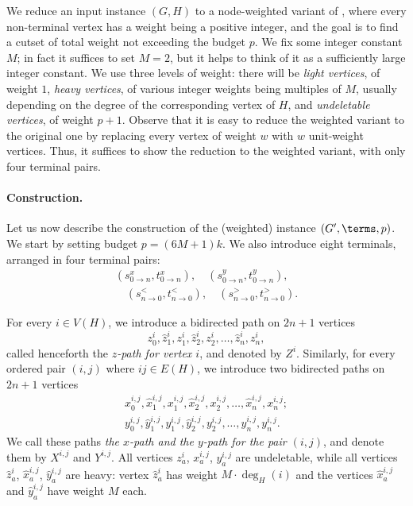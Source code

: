 \newcommand{\sincx}{s_{0 \to n}^{x}}
\newcommand{\tincx}{t_{0 \to n}^{x}}
\newcommand{\sincy}{s_{0 \to n}^{y}}
\newcommand{\tincy}{t_{0 \to n}^{y}}
\newcommand{\sdeclt}{s_{n \to 0}^{<}}
\newcommand{\tdeclt}{t_{n \to 0}^{<}}
\newcommand{\sdecgt}{s_{n \to 0}^{>}}
\newcommand{\tdecgt}{t_{n \to 0}^{>}}

We reduce an input \subiso{} instance $(G,H)$
to a node-weighted variant of \dirmc{}, where every non-terminal vertex has a weight being a positive integer, and the goal is to find a cutset of total weight
not exceeding the budget $p$.
We fix some integer constant $M$; in fact it suffices to set $M=2$,
but it helps to think of it as a sufficiently large integer constant.
 We use three levels of weight: there will be \emph{light vertices}, of weight $1$, \emph{heavy vertices}, of various integer weights being multiples of $M$,
usually depending on the degree of the corresponding vertex of $H$, and \emph{undeletable vertices}, of weight $p+1$. Observe that it is easy to reduce the weighted variant to the original one by replacing every vertex of weight $w$ with $w$ unit-weight vertices. Thus, it suffices to show the reduction to the weighted variant, with only four terminal pairs.

\paragraph{Construction.}
Let us now describe the construction of the (weighted)
\dirmc{} instance $(G',\terms,p)$.
We start by setting budget $p = (6M+1)k$.
We also introduce eight terminals, arranged in four terminal pairs:
\begin{equation*}
\begin{split}
(\sincx,\tincx),\quad (\sincy,\tincy), \\ \quad (\sdeclt,\tdeclt), \quad (\sdecgt,\tdecgt).
\end{split}
\end{equation*}
 
For every $i \in V(H)$, we introduce a bidirected path on $2n+1$ vertices
$$z^i_0, \hat{z}^i_1, z^i_1, \hat{z}^i_2, z^i_2, \ldots, \hat{z}^i_n, z^i_n,$$
called henceforth the \emph{$z$-path for vertex $i$}, and denoted by $Z^i$.
Similarly, for every ordered pair $(i,j)$ where $ij \in E(H)$, we introduce two bidirected paths on $2n+1$ vertices
\begin{equation*}
\begin{split}
x^{i,j}_0, \hat{x}^{i,j}_1, x^{i,j}_1, \hat{x}^{i,j}_2, x^{i,j}_2, \ldots, \hat{x}^{i,j}_n, x^{i,j}_n;\\
y^{i,j}_0, \hat{y}^{i,j}_1, y^{i,j}_1, \hat{y}^{i,j}_2, y^{i,j}_2, \ldots, \hat{y}^{i,j}_n, y^{i,j}_n.
\end{split}
\end{equation*}
We call these paths \emph{the $x$-path and the $y$-path for the pair $(i,j)$}, and denote them by $X^{i,j}$ and $Y^{i,j}$.
All vertices $z^i_a$, $x^{i,j}_a$, $y^{i,j}_a$ are undeletable, while all vertices $\hat{z}^i_a$, $\hat{x}^{i,j}_a$, $\hat{y}^{i,j}_a$ are heavy:
vertex $\hat{z}^i_a$ has weight $M \cdot \deg_H(i)$ and the vertices
$\hat{x}^{i,j}_a$ and $\hat{y}^{i,j}_a$ have weight $M$ each.

